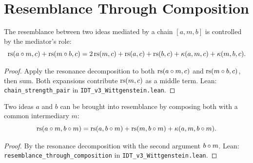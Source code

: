 \section{Resemblance Through Composition}

\begin{theorem}
\label{thm:chain-strength}
The resemblance between two ideas mediated by a chain $[a, m, b]$ is
controlled by the mediator's role:
\[
\mathrm{rs}(a \circ m, c) + \mathrm{rs}(m \circ b, c)
= 2\,\mathrm{rs}(m, c) + \mathrm{rs}(a, c) + \mathrm{rs}(b, c) + \kappa(a, m, c) + \kappa(m, b, c).
\]
\end{theorem}

\begin{proof}
Apply the resonance decomposition to both $\mathrm{rs}(a \circ m, c)$ and
$\mathrm{rs}(m \circ b, c)$, then sum. Both expansions contribute $\mathrm{rs}(m, c)$
as a middle term.
Lean: \texttt{chain\_strength\_pair} in \texttt{IDT\_v3\_Wittgenstein.lean}.
\end{proof}

\begin{theorem}
\label{thm:resemblance-composition}
Two ideas $a$ and $b$ can be brought into resemblance by composing both with
a common intermediary $m$:
\[
\mathrm{rs}(a \circ m, b \circ m) = \mathrm{rs}(a, b \circ m) + \mathrm{rs}(m, b \circ m)
+ \kappa(a, m, b \circ m).
\]
\end{theorem}

\begin{proof}
By the resonance decomposition with the second argument $b \circ m$.
Lean: \texttt{resemblance\_through\_composition} in
\texttt{IDT\_v3\_Wittgenstein.lean}.
\end{proof}

